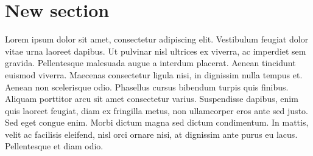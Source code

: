 \documentclass{article}
\begin{document}
%
%

\section{New section}


\beginnumbering  
\pstart  
Lorem ipsum dolor sit amet, consectetur adipiscing elit. Vestibulum feugiat dolor vitae urna laoreet dapibus. Ut pulvinar nisl ultrices ex viverra, ac imperdiet sem gravida. Pellentesque malesuada augue a interdum placerat. Aenean tincidunt euismod viverra. Maecenas consectetur ligula nisi, in dignissim nulla tempus et. Aenean non scelerisque odio. Phasellus cursus bibendum turpis quis finibus. Aliquam porttitor arcu sit amet consectetur varius. Suspendisse dapibus, enim quis laoreet feugiat, diam ex fringilla metus, non ullamcorper eros ante sed justo. Sed eget congue enim. Morbi dictum magna sed dictum condimentum. In mattis, velit ac facilisis eleifend, nisl orci ornare nisi, at dignissim ante purus eu lacus. Pellentesque et diam odio.
\pend  
\pausenumbering
\end{document}
